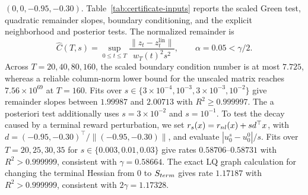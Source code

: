 \documentclass[twocolumn,nameyear,amsthm]{autart}
\newcommand{\lin}{\mathrm{lin}}
\numberwithin{equation}{section}
\begin{document}
$(0,0,-0.95,-0.30)$.  Table~\ref{tab:certificate-inputs} reports the scaled Green
test, quadratic remainder slopes, boundary conditioning, and the explicit
neighborhood and posterior tests.  The normalized remainder is
\[
 \widehat C(T,s)=\sup_{0\le t\le T}
 \frac{\|z_t-z_t^{\lin}\|}{w_T(t)^2s^2},
 \qquad \alpha=0.05<\gamma/2 .
\]
Across $T=20,40,80,160$, the scaled boundary condition number is at most
$7.725$, whereas a reliable column-norm lower bound for the unscaled matrix
reaches $7.56\times10^{69}$ at $T=160$.  Fits over
$s\in\{3\times10^{-4},10^{-3},3\times10^{-3},10^{-2}\}$ give remainder
slopes between $1.99987$ and $2.00713$ with $R^2\ge0.999997$.
The a posteriori test additionally uses $s=3\times10^{-2}$ and $s=10^{-1}$.
To test the decay caused by a terminal reward perturbation, we set
$r_s(x)=r_{\rm nl}(x)+s d^\top x$, with
$d=(-0.95,-0.30)^\top/\|(-0.95,-0.30)\|$, and evaluate
$|u_0^s-u_0^0|/s$.  Fits over $T=20,25,30,35$ for
$s\in\{0.003,0.01,0.03\}$ give rates $0.58706$--$0.58731$ with
$R^2>0.999999$, consistent with $\gamma=0.58664$.  The exact LQ graph calculation
for changing the terminal Hessian from $0$ to $S_{\rm term}$ gives rate
$1.17187$ with $R^2>0.999999$, consistent with $2\gamma=1.17328$.
\end{document}
